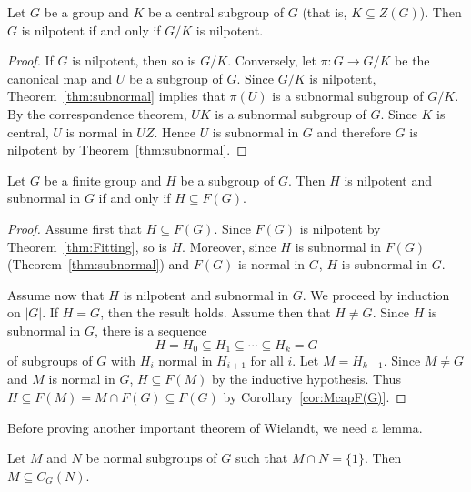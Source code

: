 
\begin{corollary}
	Let $G$ be a group and $K$ be a central subgroup of $G$ (that is, $K\subseteq Z(G)$).
	Then $G$ is nilpotent if and only if $G/K$ is nilpotent. 
\end{corollary}

\begin{proof}
	If $G$ is nilpotent, then so is $G/K$. Conversely, let 
	$\pi\colon G\to G/K$ be the canonical map and $U$ be a subgroup of $G$. Since 
	$G/K$ is nilpotent, Theorem~\ref{thm:subnormal} implies that 
	$\pi(U)$ is a subnormal subgroup of $G/K$. By the correspondence theorem, 
 	$UK$ is a subnormal subgroup of $G$. Since $K$ is central, $U$ is normal in 
	$UZ$. Hence $U$ is subnormal in $G$ and therefore $G$ is nilpotent by Theorem~\ref{thm:subnormal}.
\end{proof}

\begin{theorem}
	\label{thm:F(G)subnormalidad}
	Let $G$ be a finite group and $H$ be a subgroup of $G$. Then $H$ is nilpotent and subnormal in $G$ if and only if 
    $H\subseteq F(G)$.
\end{theorem}

\begin{proof}
	Assume first that $H\subseteq F(G)$. Since $F(G)$ is nilpotent by Theorem~\ref{thm:Fitting}, 
    so is $H$. Moreover, since $H$ is subnormal in $F(G)$ (Theorem~\ref{thm:subnormal}) 
    and $F(G)$ is normal in $G$, $H$ is
	subnormal in $G$.

	Assume now that $H$ is nilpotent and subnormal in $G$. We proceed by induction on $|G|$. 
    If $H=G$, then the result holds. Assume then that $H\ne G$. Since $H$ is subnormal in $G$, there is a sequence 
	\[
		H=H_0\subseteq H_1\subseteq\cdots\subseteq H_k=G
	\]
    of subgroups of $G$ with $H_i$ normal in $H_{i+1}$ for all $i$. 
	Let $M=H_{k-1}$. Since $M\ne G$ and $M$ is normal in $G$, 
	$H\subseteq F(M)$ by the inductive hypothesis. Thus $H\subseteq F(M)=M\cap
	F(G)\subseteq F(G)$ by Corollary~\ref{cor:McapF(G)}.
\end{proof}

Before proving another important theorem of Wielandt, we need a lemma. 

\begin{lemma}
	\label{lem:McapN=1}
	Let $M$ and $N$ be normal subgroups of $G$ such that $M\cap N=\{1\}$.
	Then $M\subseteq C_G(N)$.
\end{lemma}

